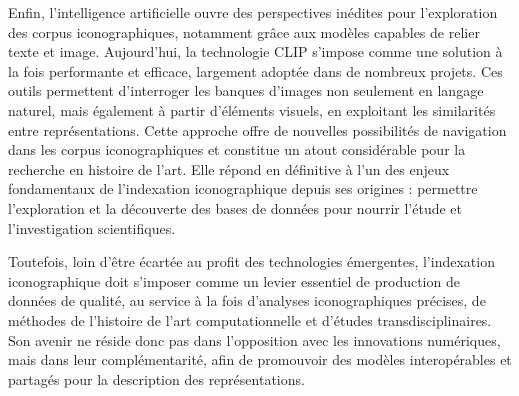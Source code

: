 Enfin, l’intelligence artificielle ouvre des perspectives inédites pour l’exploration des corpus iconographiques, notamment grâce aux modèles capables de relier texte et image. Aujourd’hui, la technologie CLIP s’impose comme une solution à la fois performante et efficace, largement adoptée dans de nombreux projets. Ces outils permettent d’interroger les banques d’images non seulement en langage naturel, mais également à partir d’éléments visuels, en exploitant les similarités entre représentations. Cette approche offre de nouvelles possibilités de navigation dans les corpus iconographiques et constitue un atout considérable pour la recherche en histoire de l’art. Elle répond en définitive à l’un des enjeux fondamentaux de l’indexation iconographique depuis ses origines : permettre l’exploration et la découverte des bases de données pour nourrir l’étude et l’investigation scientifiques.

Toutefois, loin d’être écartée au profit des technologies émergentes, l’indexation iconographique doit s’imposer comme un levier essentiel de production de données de qualité, au service à la fois d’analyses iconographiques précises, de méthodes de l’histoire de l’art computationnelle et d’études transdisciplinaires. Son avenir ne réside donc pas dans l’opposition avec les innovations numériques, mais dans leur complémentarité, afin de promouvoir des modèles interopérables et partagés pour la description des représentations.